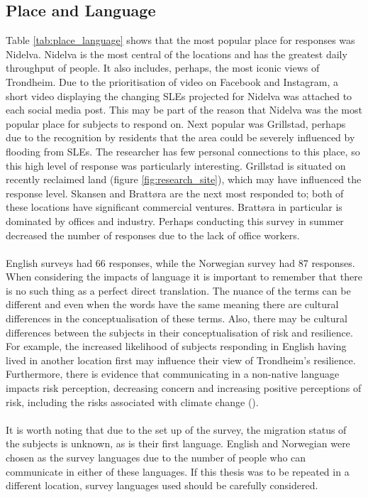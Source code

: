 \subsection{Place and Language}
Table \ref{tab:place_language} shows that the most popular place for responses was Nidelva. Nidelva is the most central of the locations and has the greatest daily throughput of people. It also includes, perhaps, the most iconic views of Trondheim. Due to the prioritisation of video on Facebook and Instagram, a short video displaying the changing SLEs projected for Nidelva was attached to each social media post. This may be part of the reason that Nidelva was the most popular place for subjects to respond on.  Next popular was Grillstad, perhaps due to the recognition by residents that the area could be severely influenced by flooding from SLEs. The researcher has few personal connections to this place, so this high level of response was particularly interesting. Grillstad is situated on recently reclaimed land (figure \ref{fig:research_site}), which may have influenced the response level. Skansen and Brattøra are the next most responded to; both of these locations have significant commercial ventures. Brattøra in particular is dominated by offices and industry. Perhaps conducting this survey in summer decreased the number of responses due to the lack of office workers. 
\paragraph{}
English surveys had 66 responses, while the Norwegian survey had 87 responses. When considering the impacts of language it is important to remember that there is no such thing as a perfect direct translation. The nuance of the terms can be different and even when the words have the same meaning there are cultural differences in the conceptualisation of these terms. Also, there may be cultural differences between the subjects in their conceptualisation of risk and resilience. For example, the increased likelihood of subjects responding in English having lived in another location first may influence their view of Trondheim's resilience. Furthermore, there is evidence that communicating in a non-native language impacts risk perception, decreasing concern and increasing positive perceptions of risk, including the risks associated with climate change (\cite{hadjichristidis_effect_2015}).

\paragraph{}
It is worth noting that due to the set up of the survey, the migration status of the subjects is unknown, as is their first language. English and Norwegian were chosen as the survey languages due to the number of people who can communicate in either of these languages. If this thesis was to be repeated in a different location, survey languages used should be carefully considered.


